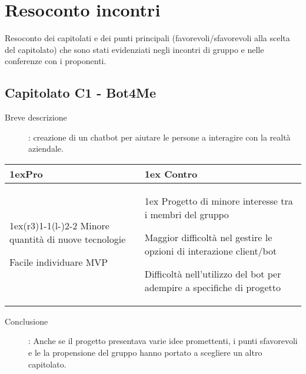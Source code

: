 \section{Resoconto incontri}
Resoconto dei capitolati e dei punti principali (favorevoli/sfavorevoli alla scelta del capitolato) che sono stati evidenziati negli incontri di gruppo e nelle conferenze con i proponenti.

\subsection*{Capitolato C1 - Bot4Me}
\begin{description}
	\item [Breve descrizione]: creazione di un chatbot per aiutare le persone a interagire con la realtà aziendale.
\end{description}
\begin{table}[h]
\begin{tabularx}{\linewidth}{>{\parskip1ex}X@{\kern4\tabcolsep}>{\parskip1ex}X}
\hfil\bfseries Pro
&
\hfil\bfseries Contro
\\\cmidrule(r{3\tabcolsep}){1-1}\cmidrule(l{-\tabcolsep}){2-2}
Minore quantità di nuove tecnologie \par
Facile individuare MVP
&
Progetto di minore interesse tra i membri del gruppo \par
Maggior difficoltà nel gestire le opzioni di interazione client/bot \par
Difficoltà nell'utilizzo del bot per adempire a specifiche di progetto
\end{tabularx}
\end{table}
\begin{description}
	\item [Conclusione]: Anche se il progetto presentava varie idee promettenti, i punti sfavorevoli e le la propensione del gruppo hanno portato a scegliere un altro capitolato.
\end{description}


